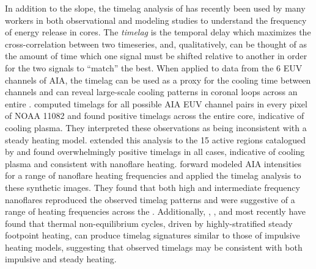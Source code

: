 In addition to the \dem{} slope, the timelag analysis of \citet{viall_evidence_2012} has recently been used by many workers in both observational and modeling studies to understand the frequency of energy release in \AR{} cores. The \textit{timelag} is the temporal delay which maximizes the cross-correlation between two timeseries, and, qualitatively, can be thought of as the amount of time which one signal must be shifted relative to another in order for the two signals to ``match'' the best. When applied to data from the 6 EUV channels of AIA, the timelag can be used as a proxy for the cooling time between channels and can reveal large-scale cooling patterns in coronal loops across an entire \AR{}. \citeauthor{viall_evidence_2012} computed timelags for all possible AIA EUV channel pairs in every pixel of \AR{} NOAA 11082 and found positive timelags across the entire \AR{} core, indicative of cooling plasma. They interpreted these observations as being inconsistent with a steady heating model. \citet{viall_survey_2017} extended this analysis to the 15 active regions catalogued by \citet{warren_systematic_2012} and found overwhelmingly positive timelags in all cases, indicative of cooling plasma and consistent with nanoflare heating. \citet{bradshaw_patterns_2016} forward modeled AIA intensities for a range of nanoflare heating frequencies and applied the timelag analysis to these synthetic images. They found that both high and intermediate frequency nanoflares reproduced the observed timelag patterns and were suggestive of a range of heating frequencies across the \AR{}.  Additionally, \citet{lionello_can_2016}, \citet{winebarger_investigation_2016}, and most recently \citet{winebarger_identifying_2018} have found that thermal non-equilibrium cycles, driven by highly-stratified steady footpoint heating, can produce timelag signatures similar to those of impulsive heating models, suggesting that observed timelags may be consistent with both impulsive and steady heating.


